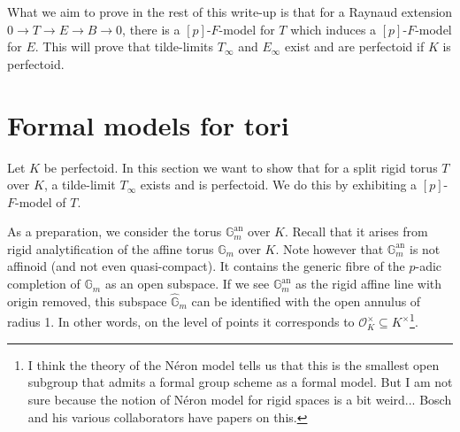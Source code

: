 \documentclass[11pt,oneside]{amsart}
\theoremstyle{definition}
\theoremstyle{remark}
\begin{document}
	What we aim to prove in the rest of this write-up is that for a Raynaud extension $0\rightarrow T\rightarrow E\rightarrow B\rightarrow 0$, there is a $[p]$-$F$-model for $T$ which induces a $[p]$-$F$-model for $E$. This will prove that tilde-limits $T_\infty$ and $E_\infty$ exist and are perfectoid if $K$ is perfectoid.
	
	\section{Formal models for tori}
	
	Let $K$ be perfectoid. In this section we want to show that for a split rigid torus $T$ over $K$, a tilde-limit $T_\infty$ exists and is perfectoid. We do this by exhibiting a $[p]$-$F$-model of $T$.
	
	As a preparation, we consider the torus $\mathbb G_m^{\operatorname{an}}$ over $K$. Recall that it arises from rigid analytification of the affine torus $\mathbb G_m$ over $K$. Note however that $\mathbb G_m^{\operatorname{an}}$ is not affinoid (and not even quasi-compact). It contains the generic fibre of the $p$-adic completion of $\mathbb G_m$ as an open subspace. If we see $\mathbb G_m^{\operatorname{an}}$ as the rigid affine line with origin removed, this subspace $\widehat{\mathbb G}_m$ can be identified with the open annulus of radius 1. In other words, on the level of points it corresponds to $\mathcal O_K^\times \subseteq K^\times$\footnote{I think the theory of the N\'eron model tells us that this is the smallest open subgroup that admits a formal group scheme as a formal model. But I am not sure because the notion of N\'eron model for rigid spaces is a bit weird... Bosch and his various collaborators have papers on this.}.
\end{document}
